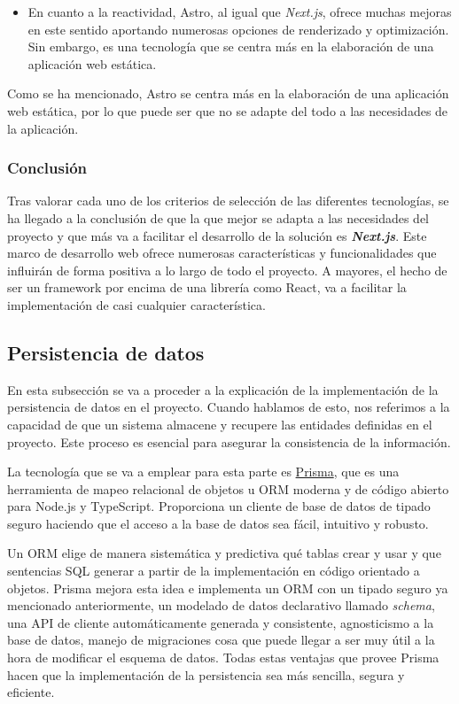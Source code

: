 \begin{itemize}
  \item[\regular] En cuanto a la reactividad, Astro, al igual que \textit{Next.js}, ofrece muchas mejoras en este sentido aportando numerosas opciones de renderizado y optimización. Sin embargo, es una tecnología que se centra más en la elaboración de una aplicación web estática. 
\end{itemize}

Como se ha mencionado, Astro se centra más en la elaboración de una aplicación web estática, por lo que puede ser que no se adapte del todo a las necesidades de la aplicación.

\subsubsection{Conclusión}

Tras valorar cada uno de los criterios de selección de las diferentes tecnologías, se ha llegado a la conclusión de que la que mejor se adapta a las necesidades del proyecto y que más va a facilitar el desarrollo de la solución es \textbf{\textit{Next.js}}. Este marco de desarrollo web ofrece numerosas características y funcionalidades que influirán de forma positiva a lo largo de todo el proyecto. A mayores, el hecho de ser un framework por encima de una librería como React, va a facilitar la implementación de casi cualquier característica.

\subsection{Persistencia de datos}

En esta subsección se va a proceder a la explicación de la implementación de la persistencia de datos en el proyecto. Cuando hablamos de esto, nos referimos a la capacidad de que un sistema almacene y recupere las entidades definidas en el proyecto. Este proceso es esencial para asegurar la consistencia de la información.

La tecnología que se va a emplear para esta parte es \href{https://www.prisma.io/}{Prisma}, que es una herramienta de mapeo relacional de objetos u ORM moderna y de código abierto para Node.js y TypeScript. Proporciona un cliente de base de datos de tipado seguro haciendo que el acceso a la base de datos sea fácil, intuitivo y robusto.

Un ORM elige de manera sistemática y predictiva qué tablas crear y usar y que sentencias SQL generar a partir de la implementación en código orientado a objetos. Prisma mejora esta idea e implementa un ORM con un tipado seguro ya mencionado anteriormente, un modelado de datos declarativo llamado \textit{schema}, una API de cliente automáticamente generada y consistente, agnosticismo a la base de datos, manejo de migraciones cosa que puede llegar a ser muy útil a la hora de modificar el esquema de datos. Todas estas ventajas que provee Prisma hacen que la implementación de la persistencia sea más sencilla, segura y eficiente.

